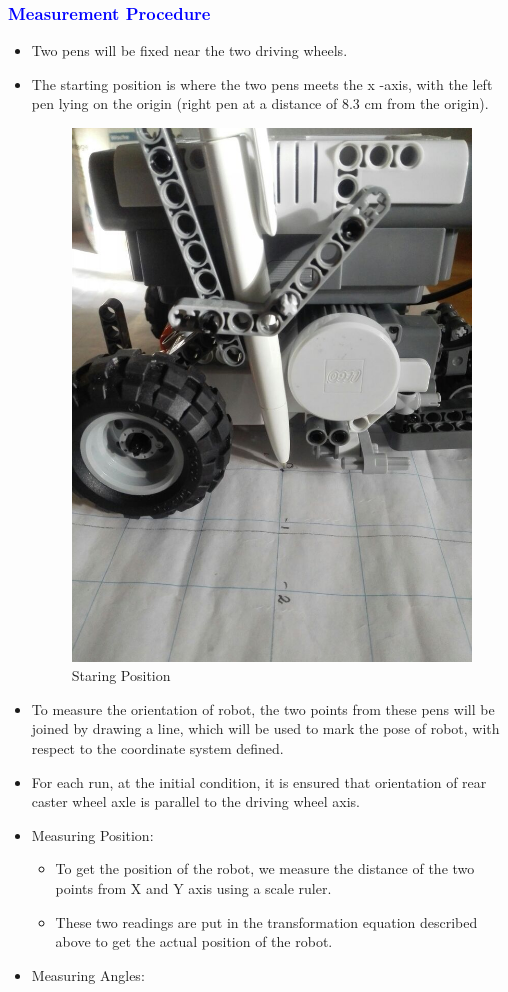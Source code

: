 \documentclass[10pt,a4paper]{article}
\begin{document}
				\subsubsection{\textcolor{blue}{Measurement Procedure}}
				\begin{itemize}
					\item Two pens will be fixed near the two driving wheels.
					\item The starting position is where the two pens meets the x -axis, with the left pen lying on the origin (right pen at a distance of  8.3 cm from the origin).			
					\begin{figure}[h]
						\centering
						\includegraphics[width=0.4\linewidth]{img/starting-pt.jpeg}
						\caption{Staring Position}
						\label{fig:startingView}
					\end{figure}
					\item To measure the orientation of robot, the two points from these pens will be joined by drawing a line, which will be used to mark the pose of robot, with respect to the coordinate system defined.
					\item For each run, at the initial condition, it is ensured that orientation of rear caster wheel axle is parallel to the driving wheel axis.
					\item Measuring Position:
						\begin{itemize}
							\item To get the position of the robot, we measure the distance of the two points from X and Y axis using a scale ruler.
							\item These two readings are put in the transformation equation described above to get the actual position of the robot.
						\end{itemize}
					\item Measuring Angles:
						\begin{itemize}

\end{itemize}
\end{itemize}
\end{document}
